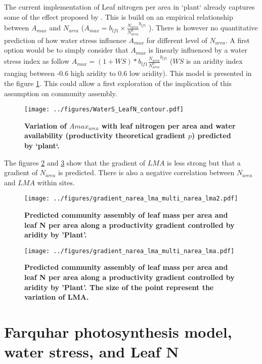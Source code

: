 \documentclass[a4paper,11pt]{article}
\begin{document}
 The current implementation of Leaf nitrogen per area in `plant` already captures some of the effect proposed by \citet{Wright-2003}. This is build on an empirical relationship between $A_{max}$ and $N_{area}$ 
($A_{max} = b_{lf1} \times \frac{N_{area}}{N^0_{area}}^{b_{lf5}}$ \citep{Falster-2016}). There is however no quantitative prediction of how water stress influence $A_{max}$ for different level of $N_{area}$. A first option would be to simply consider that $A_{max}$ is linearly influenced by a water stress index  as follow $A_{max} = (1+WS) * b_{lf1} \frac{N_{area}}{N^0_{area}}^{b_{lf5}}$ ($WS$ is an aridity index ranging between -0.6 high aridity to 0.6 low aridity). This model is presented in the figure \ref{fig:leafN_water}. This could allow a first exploration of the implication of this assumption on community assembly. 


\begin{figure}[ht]
\centering
\texttt{[image: ../figures/WaterS\_LeafN\_contour.pdf]}
\caption{\textbf{Variation of $A{max}_{area}$ with leaf nitrogen per area and water availability (productivity theoretical gradient $p$) predicted by `plant`.}
\label{fig:leafN_water}}
\end{figure}

The figures \ref{fig:lma_narea1} and \ref{fig:lma_narea2} show that the gradient of $LMA$ is less strong but that a gradient of $N_{area}$ is predicted. There is also a negative correlation between $N_{area}$ and $LMA$ within sites.

\begin{figure}[ht]
\centering
\texttt{[image: ../figures/gradient\_narea\_lma\_multi\_narea\_lma2.pdf]}
\caption{\textbf{Predicted community assembly of leaf mass per area and leaf N per area along a productivity gradient controlled by aridity by 'Plant'.}
\label{fig:lma_narea1}}
\end{figure}

\begin{figure}[ht]
\centering
\texttt{[image: ../figures/gradient\_narea\_lma\_multi\_narea\_lma.pdf]}
\caption{\textbf{Predicted community assembly of leaf mass per area and leaf N per area along a productivity gradient controlled by aridity by 'Plant'. The size of the point represent the variation of LMA.}
\label{fig:lma_narea2}}
\end{figure}

\clearpage

\section{Farquhar photosynthesis model, water stress, and Leaf N}
\end{document}
